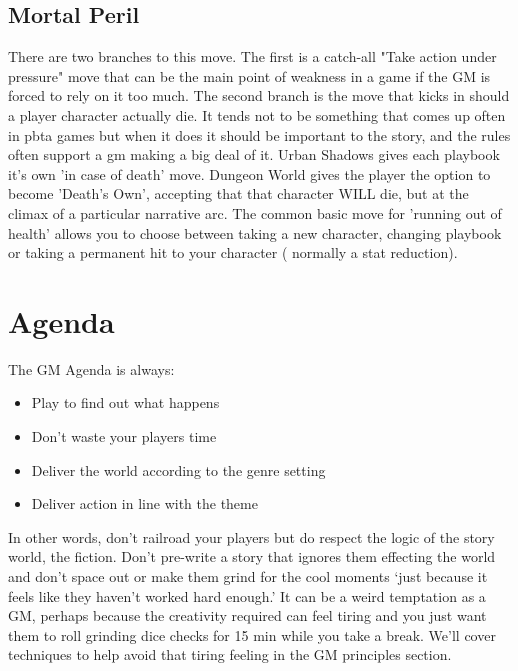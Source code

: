 \documentclass{tufte-handout}
\begin{document}
\subsection{Mortal Peril}
There are two branches to this move. The first is a catch-all "Take action under pressure" move that can be the main point of weakness in a game if the GM is forced to rely on it too much. 
The second branch is the move that kicks in should a player character actually die. It tends not to be something that comes up often in pbta games but when it does it should be important to the story, and the rules often support a gm making a big deal of it. Urban Shadows gives each playbook it's own 'in case of death' move. Dungeon World gives the player the option to become 'Death's Own', accepting that that character WILL die, but at the climax of a particular narrative arc.
The common basic move for 'running out of health' allows you to choose between taking a new character, changing playbook or taking a permanent hit to your character ( normally a stat reduction). 

\section{Agenda}
The GM Agenda is always:

\begin{itemize}
\item Play to find out what happens
\item Don't waste your players time
\item Deliver the world according to the genre setting
\item Deliver action in line with the theme
\end{itemize}

In other words, don't railroad your players but do respect the logic of the story world, the fiction. Don't pre-write a story that ignores them effecting the world and don't space out or make them grind for the cool moments `just because it feels like they haven't worked hard enough.' It can be a weird temptation as a GM, perhaps because the creativity required can feel tiring and you just want them to roll grinding dice checks for 15 min while you take a break. We'll cover techniques to help avoid that tiring feeling in the GM principles section.
\end{document}
